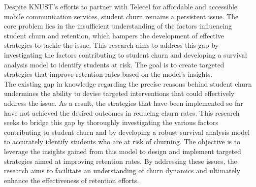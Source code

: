 \documentclass[doublespacing,12pt]{report}
\begin{document}
Despite KNUST's efforts to partner with Telecel for affordable and accessible mobile communication services, student churn remains a persistent issue. The core problem lies in the insufficient understanding of the factors influencing student churn and retention, which hampers the development of effective strategies to tackle the issue. This research aims to address this gap by investigating the factors contributing to student churn and developing a survival analysis model to identify students at risk. The goal is to create targeted strategies that improve retention rates based on the model's insights.\\
The existing gap in knowledge regarding the precise reasons behind student churn undermines the ability to devise targeted interventions that could effectively address the issue. As a result, the strategies that have been implemented so far have not achieved the desired outcomes in reducing churn rates. This research seeks to bridge this gap by thoroughly investigating the various factors contributing to student churn and by developing a robust survival analysis model to accurately identify students who are at risk of churning. The objective is to leverage the insights gained from this model to design and implement targeted strategies aimed at improving retention rates. By addressing these issues, the research aims to facilitate an understanding of churn dynamics and ultimately enhance the effectiveness of retention efforts.
\end{document}
